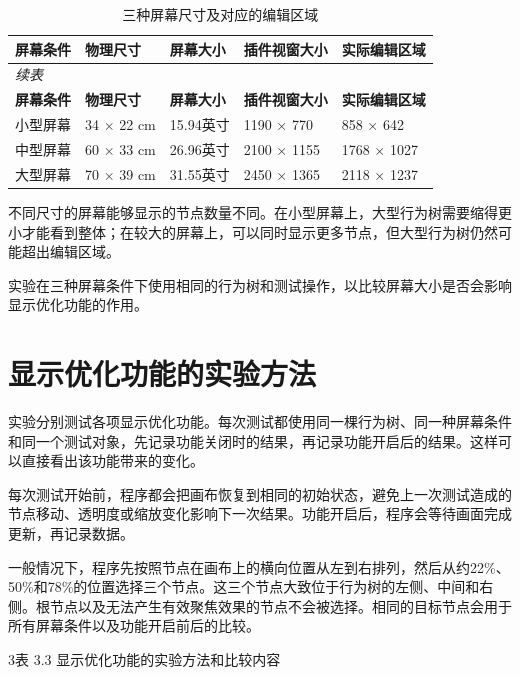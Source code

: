 \documentclass[11pt,a4paper,oneside,extrafontsizes]{memoir}
\begin{document}
\begin{center}

\begin{longtable}{@{}p{} p{} p{} p{} p{}@{}}
\caption{三种屏幕尺寸及对应的编辑区域}\label{tab:screen-configs}\\
\toprule
\textbf{屏幕条件} & \textbf{物理尺寸} & \textbf{屏幕大小} & \textbf{插件视窗大小} & \textbf{实际编辑区域} \\
\midrule
\endfirsthead
\multicolumn{5}{l}{\itshape 续表}\\
\toprule
\textbf{屏幕条件} & \textbf{物理尺寸} & \textbf{屏幕大小} & \textbf{插件视窗大小} & \textbf{实际编辑区域} \\
\midrule
\endhead
小型屏幕 & 34 × 22 cm & 15.94英寸 & 1190 × 770 & 858 × 642 \\
中型屏幕 & 60 × 33 cm & 26.96英寸 & 2100 × 1155 & 1768 × 1027 \\
大型屏幕 & 70 × 39 cm & 31.55英寸 & 2450 × 1365 & 2118 × 1237 \\
\bottomrule
\end{longtable}
\end{center}

不同尺寸的屏幕能够显示的节点数量不同。在小型屏幕上，大型行为树需要缩得更小才能看到整体；在较大的屏幕上，可以同时显示更多节点，但大型行为树仍然可能超出编辑区域。

实验在三种屏幕条件下使用相同的行为树和测试操作，以比较屏幕大小是否会影响显示优化功能的作用。

\section{显示优化功能的实验方法}

实验分别测试各项显示优化功能。每次测试都使用同一棵行为树、同一种屏幕条件和同一个测试对象，先记录功能关闭时的结果，再记录功能开启后的结果。这样可以直接看出该功能带来的变化。

每次测试开始前，程序都会把画布恢复到相同的初始状态，避免上一次测试造成的节点移动、透明度或缩放变化影响下一次结果。功能开启后，程序会等待画面完成更新，再记录数据。

一般情况下，程序先按照节点在画布上的横向位置从左到右排列，然后从约22\%、50\%和78\%的位置选择三个节点。这三个节点大致位于行为树的左侧、中间和右侧。根节点以及无法产生有效聚焦效果的节点不会被选择。相同的目标节点会用于所有屏幕条件以及功能开启前后的比较。

3表 3.3 显示优化功能的实验方法和比较内容
\end{document}
